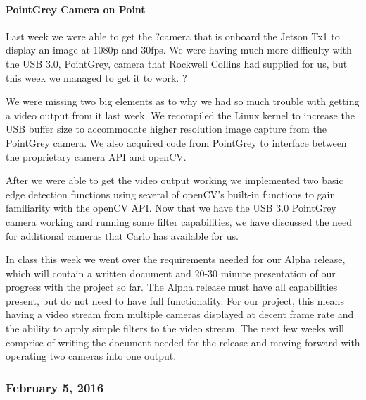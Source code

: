 \paragraph{PointGrey Camera on Point}
Last week we were able to get the ?camera that is onboard the Jetson Tx1 to display an image at 1080p and 30fps. We were having much more difficulty with the USB 3.0, PointGrey, camera that Rockwell Collins had supplied for us, but this week we managed to get it to work. ?
\par
We were missing two big elements as to why we had so much trouble with getting a video output from it last week. We recompiled the Linux kernel to increase the USB buffer size to accommodate higher resolution image capture from the PointGrey camera. We also acquired code from PointGrey to interface between the proprietary camera API and openCV.
\par
After we were able to get the video output working we implemented two basic edge detection functions using several of openCV's built-in functions to gain familiarity with the openCV API. Now that we have the USB 3.0 PointGrey camera working and running some filter capabilities, we have discussed the need for additional cameras that Carlo has available for us. 
\par
In class this week we went over the requirements needed for our Alpha release, which will contain a written document and 20-30 minute presentation of our progress with the project so far. The Alpha release must have all capabilities present, but do not need to have full functionality. For our project, this means having a video stream from multiple cameras displayed at decent frame rate and the ability to apply simple filters to the video stream. The next few weeks will comprise of writing the document needed for the release and moving forward with operating two cameras into one output.\\

\subsubsection{February 5, 2016}
